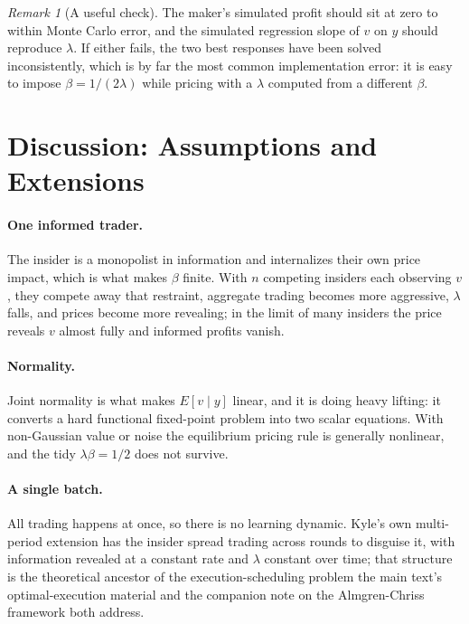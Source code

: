 \documentclass[11pt]{article}
\theoremstyle{remark}
\newtheorem*{remark}{Remark}
\theoremstyle{definition}
\begin{document}
\begin{remark}[A useful check]
\label{rem:check}
The maker's simulated profit should sit at zero to within Monte Carlo error, and the simulated regression slope of $v$ on $y$ should reproduce $\lambda$. If either fails, the two best responses have been solved inconsistently, which is by far the most common implementation error: it is easy to impose $\beta = 1/(2\lambda)$ while pricing with a $\lambda$ computed from a different $\beta$.
\end{remark}

\section{Discussion: Assumptions and Extensions}
\label{sec:discussion}

\paragraph{One informed trader.} The insider is a monopolist in information and internalizes their own price impact, which is what makes $\beta$ finite. With $n$ competing insiders each observing $v$, they compete away that restraint, aggregate trading becomes more aggressive, $\lambda$ falls, and prices become more revealing; in the limit of many insiders the price reveals $v$ almost fully and informed profits vanish.

\paragraph{Normality.} Joint normality is what makes $E[v\mid y]$ linear, and it is doing heavy lifting: it converts a hard functional fixed-point problem into two scalar equations. With non-Gaussian value or noise the equilibrium pricing rule is generally nonlinear, and the tidy $\lambda\beta = 1/2$ does not survive.

\paragraph{A single batch.} All trading happens at once, so there is no learning dynamic. Kyle's own multi-period extension has the insider spread trading across rounds to disguise it, with information revealed at a constant rate and $\lambda$ constant over time; that structure is the theoretical ancestor of the execution-scheduling problem the main text's optimal-execution material and the companion note on the Almgren-Chriss framework both address.
\end{document}
